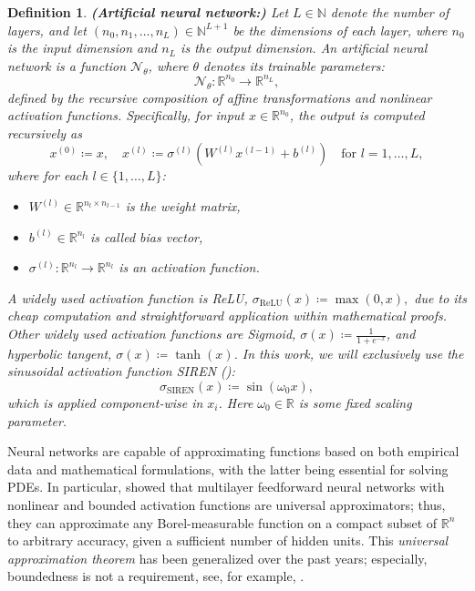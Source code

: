 \documentclass[12pt,openany]{book}
\newcommand{\R}{\mathbb{R}}
\theoremstyle{plainnormal}
\newtheorem{definition}[theorem]{Definition}
\theoremstyle{remark}
\begin{document}
\begin{definition}\textbf{(Artificial neural network:)}
   Let \( L \in \mathbb{N} \) denote the number of layers, and let \( (n_0, n_1, \dots, n_L) \in \mathbb{N}^{L+1} \) be the dimensions of each layer, where \( n_0 \) is the input dimension and \( n_L \) is the output dimension. An \textit{artificial neural network} is a function $\mathcal{N}_\theta$, where $\theta$ denotes its trainable parameters:
\[
\mathcal{N}_\theta: \mathbb{R}^{n_0} \rightarrow \mathbb{R}^{n_L},
\]
defined by the recursive composition of affine transformations and nonlinear activation functions. Specifically, for input \( x \in \mathbb{R}^{n_0} \), the output is computed recursively as
\[
x^{(0)} \coloneqq x, \quad x^{(l)} \coloneqq \sigma^{(l)}(W^{(l)} x^{(l-1)} + b^{(l)}) \quad \text{for } l = 1, \dots, L,
\]
where for each \( l \in \{1, \dots, L\} \):
\begin{itemize}
    \item \( W^{(l)} \in \mathbb{R}^{n_l \times n_{l-1}} \) is the weight matrix,
    \item \( b^{(l)} \in \mathbb{R}^{n_l} \) is called bias vector,
    \item \( \sigma^{(l)}: \mathbb{R}^{n_l} \rightarrow \mathbb{R}^{n_l} \) is an activation function.
\end{itemize}
A widely used activation function is \emph{ReLU}, $\sigma_{\text{ReLU}}(x) \coloneqq \max(0, x),$
due to its cheap computation and straightforward application within mathematical proofs. Other widely used activation functions are \emph{Sigmoid}, $\sigma(x) \coloneqq \frac{1}{1+e^{-x}} $, and \emph{hyperbolic tangent}, $\sigma(x) \coloneqq\tanh(x)$.
In this work, we will exclusively use the sinusoidal activation function \emph{SIREN} (\cite{sitzmann2020implicitneuralrepresentationsperiodic}): $$\sigma_{\text{SIREN}}(x) \coloneqq \sin(\omega_0 x),$$
which is applied component-wise in $x_i$. Here $\omega_0 \in \R$ is some fixed scaling parameter. 
\end{definition}
Neural networks are capable of approximating functions based on both empirical data and mathematical formulations, with the latter being essential for solving PDEs. In particular, \cite{HORNIK1989359} showed that multilayer feedforward neural networks with nonlinear and bounded activation functions are universal approximators; thus, they can approximate any Borel-measurable function on a compact subset of $\R^n$ to arbitrary accuracy, given a sufficient number of hidden units. This \emph{universal approximation theorem} has been generalized over the past years; especially, boundedness is not a requirement, see, for example, \cite{petersen2018optimalapproximationpiecewisesmooth}. \par
\end{document}
